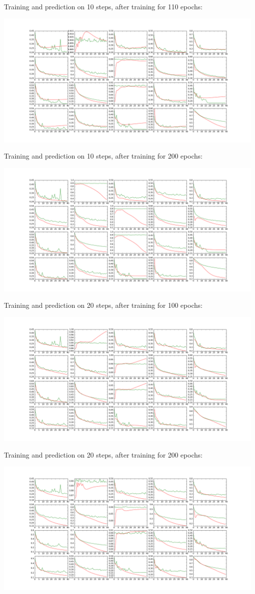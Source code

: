 \documentclass[a4paper,10pt]{article}
\begin{document}
Training and prediction on 10 steps, after training for 110 epochs:

\includegraphics[width=\textwidth]{../../figures/LSTM_m2m_10_steps_epoch_109}

Training and prediction on 10 steps, after training for 200 epochs:

\includegraphics[width=\textwidth]{../../figures/LSTM_m2m_10_steps_epoch_199}

Training and prediction on 20 steps, after training for 100 epochs:

\includegraphics[width=\textwidth]{../../figures/LSTM_m2m_20_steps_epoch_99}

Training and prediction on 20 steps, after training for 200 epochs:

\includegraphics[width=\textwidth]{../../figures/LSTM_m2m_20_steps_epoch_199}
\end{document}
